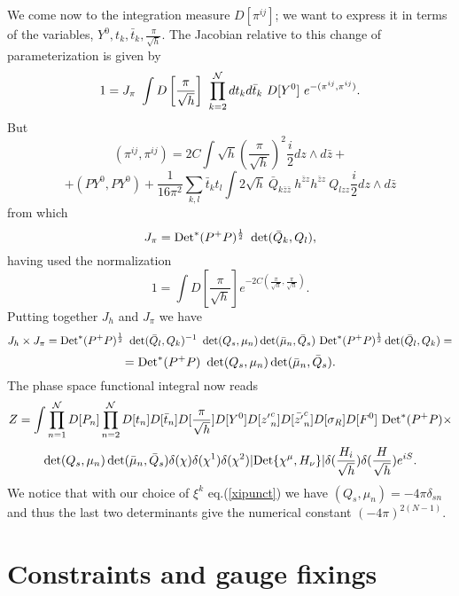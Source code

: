 \documentclass[a4paper,12pt]{article}
\begin{document}
We come now to the integration measure $D[\pi^{ij}]$; we want to
express it in terms of the variables, $Y^0, t_k, \bar t_k,
\frac{\pi}{\sqrt h}$. The Jacobian relative to this change of
parameterization is given by 
\begin{equation}
1=J_{\pi}~\int D\left[\frac{\pi}{\sqrt h}\right]~ \prod_{k=2}^{\cal N}
dt_k d\bar t_k~ 
D[Y^0]~ e^{-(\pi^{ij}, \pi^{ij}) }.
\end{equation}
But 
$$
(\pi^{ij}, \pi^{ij}) = 2C\int \sqrt h \left(\frac{\pi}{\sqrt h}\right)^2
\frac{i}{2} dz\wedge d\bar z +
$$
\begin{equation}
+(PY^0, PY^0)+ \frac{1}{16\pi^2}\sum_{k,l} \bar t_k t_l\int 2 \sqrt{h}~\bar
Q_{k\bar z\bar z}~h^{\bar z z}h^{\bar z z}~ Q_{lzz} \frac{i}{2} dz\wedge
d\bar z
\end{equation}
from which 
\begin{equation}
J_\pi = {\rm Det}^*(P^+P)^{\frac{1}{2}}~\det(\bar Q_k, Q_l ),
\end{equation}
having used the normalization
\begin{equation}
1= \int D\left[\frac{\pi}{\sqrt h}\right]
e^{-2C(\frac{\pi}{\sqrt h},\frac{\pi}{\sqrt h})}.
\end{equation}
Putting together $J_h$ and $J_\pi$ we have
$$
J_h \times J_\pi = {\rm Det}^*(P^+P)^{\frac{1}{2}}~ \det(\bar Q_l,
Q_k)^{-1}~ \det(Q_s, \mu_n)\det(\bar \mu_n, \bar Q_s)~ {\rm
Det}^*(P^+P)^{\frac{1}{2}} \det(\bar Q_l, Q_k)=
$$
\begin{equation}
= {\rm Det}^*(P^+P)~\det(Q_s, \mu_n)\det(\bar \mu_n, \bar Q_s).
\end{equation}
The phase space functional integral now reads
$$
Z= \int\prod_{n=1}^{\cal N}D[P_n]
\prod_{n=2}^{\mathcal{N}}D[t_n]D[\bar t_n]D[\frac{\pi}{\sqrt
h}]D[Y^0]D[{z'}^c_n]D[\bar{z'}^c_n] 
D[\sigma_R]D[F^0]~{\rm Det}^*(P^+P)\times
$$
\begin{equation}\label{Z4} 
\det(Q_s, \mu_n)\det(\bar \mu_n,
\bar Q_s)\delta(\chi)\delta(\chi^1)\delta(\chi^2) |{\rm
Det}\{\chi^\mu, 
H_\nu\}| \delta(\frac{H_i}{\sqrt{h}})\delta(\frac{H}{\sqrt{h}}) e^{i
S}.
\end{equation}
We notice that with our choice of $\xi^{k}$ eq.(\ref{xipunct}) we
have $(Q_s, \mu_n)=-4\pi \delta_{sn}$ and thus the last two
determinants give the numerical constant $(-4\pi)^{2(N-1)}$.


\noindent

\section{Constraints and gauge fixings}\label{Delta}
\end{document}
